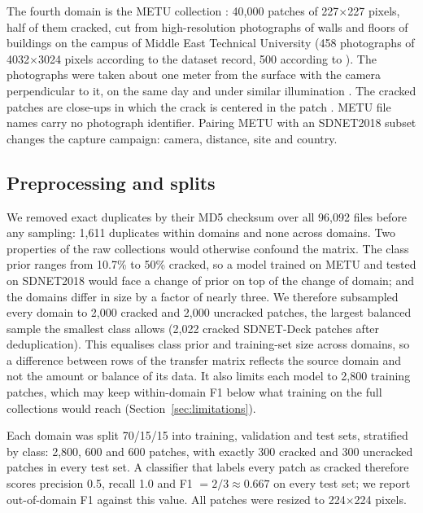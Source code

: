 \documentclass[pdflatex,sn-apa]{sn-jnl}
\begin{document}
The fourth domain is the METU collection \citep{ozgenel2019metu}: 40,000 patches of 227$\times$227 pixels, half of them cracked, cut from high-resolution photographs of walls and floors of buildings on the campus of Middle East Technical University (458 photographs of 4032$\times$3024 pixels according to the dataset record, 500 according to \citealp{ozgenel2018}). The photographs were taken about one meter from the surface with the camera perpendicular to it, on the same day and under similar illumination \citep{ozgenel2018}. The cracked patches are close-ups in which the crack is centered in the patch \citep{santos2022}. METU file names carry no photograph identifier. Pairing METU with an SDNET2018 subset changes the capture campaign: camera, distance, site and country.

\subsection{Preprocessing and splits}\label{sec:prep}

We removed exact duplicates by their MD5 checksum over all 96,092 files before any sampling: 1,611 duplicates within domains and none across domains. Two properties of the raw collections would otherwise confound the matrix. The class prior ranges from 10.7\% to 50\% cracked, so a model trained on METU and tested on SDNET2018 would face a change of prior on top of the change of domain; and the domains differ in size by a factor of nearly three. We therefore subsampled every domain to 2,000 cracked and 2,000 uncracked patches, the largest balanced sample the smallest class allows (2,022 cracked SDNET-Deck patches after deduplication). This equalises class prior and training-set size across domains, so a difference between rows of the transfer matrix reflects the source domain and not the amount or balance of its data. It also limits each model to 2,800 training patches, which may keep within-domain F1 below what training on the full collections would reach (Section~\ref{sec:limitations}).

Each domain was split 70/15/15 into training, validation and test sets, stratified by class: 2,800, 600 and 600 patches, with exactly 300 cracked and 300 uncracked patches in every test set. A classifier that labels every patch as cracked therefore scores precision 0.5, recall 1.0 and F1 $=2/3\approx0.667$ on every test set; we report out-of-domain F1 against this value. All patches were resized to 224$\times$224 pixels.
\end{document}
